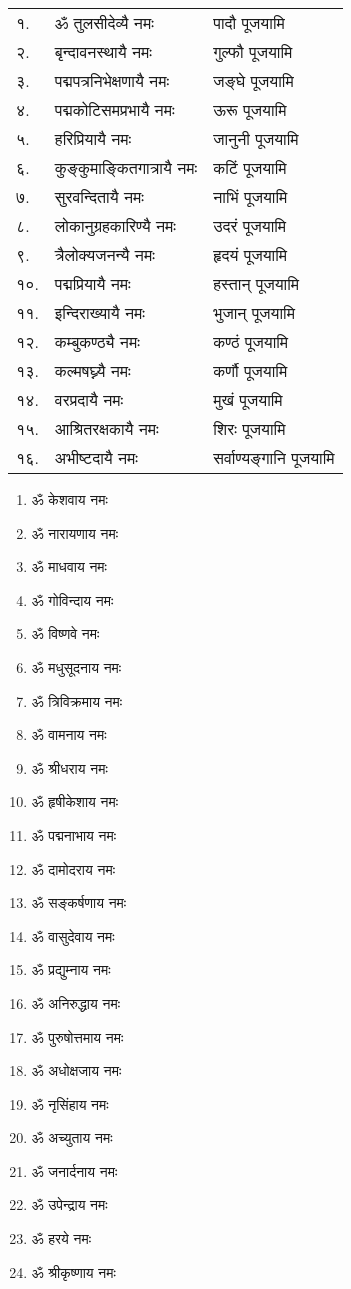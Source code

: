 \begin{longtable}{ll@{— }l}
१.& ॐ तुलसीदेव्यै नमः & पादौ पूजयामि \\
२.& बृन्दावनस्थायै नमः & गुल्फौ पूजयामि\\
३.& पद्मपत्रनिभेक्षणायै नमः & जङ्घे पूजयामि  \\
४.& पद्मकोटिसमप्रभायै नमः & ऊरू पूजयामि\\
५.& हरिप्रियायै नमः & जानुनी पूजयामि   \\
६.& कुङ्कुमाङ्कितगात्रायै नमः & कटिं पूजयामि \\
७.& सुरवन्दितायै नमः & नाभिं पूजयामि        \\
८.& लोकानुग्रहकारिण्यै नमः & उदरं पूजयामि\\
९.& त्रैलोक्यजनन्यै नमः & हृदयं पूजयामि    \\
१०.& पद्मप्रियायै नमः & हस्तान् पूजयामि\\
११.& इन्दिराख्यायै नमः & भुजान् पूजयामि\\
१२.& कम्बुकण्ठ्यै नमः & कण्ठं पूजयामि\\
१३.& कल्मषघ्न्यै नमः & कर्णौ पूजयामि  \\
१४.& वरप्रदायै नमः & मुखं  पूजयामि\\
१५.& आश्रितरक्षकायै नमः & शिरः पूजयामि\\
१६.& अभीष्टदायै नमः & सर्वाण्यङ्गानि पूजयामि   \\
\end{longtable}

\begin{multicols}{2}
\begin{enumerate}
\item ॐ केशवाय नमः
\item ॐ नारायणाय नमः
\item ॐ माधवाय नमः
\item ॐ गोविन्दाय नमः
\item ॐ विष्णवे नमः
\item ॐ मधुसूदनाय नमः
\item ॐ त्रिविक्रमाय नमः
\item ॐ वामनाय नमः
\item ॐ श्रीधराय नमः
\item ॐ हृषीकेशाय नमः
\item ॐ पद्मनाभाय नमः
\item ॐ दामोदराय नमः
\item ॐ सङ्कर्षणाय नमः
\item ॐ वासुदेवाय नमः
\item ॐ प्रद्युम्नाय नमः
\item ॐ अनिरुद्धाय नमः
\item ॐ पुरुषोत्तमाय नमः
\item ॐ अधोक्षजाय नमः
\item ॐ नृसिंहाय नमः
\item ॐ अच्युताय नमः
\item ॐ जनार्दनाय नमः
\item ॐ उपेन्द्राय नमः
\item ॐ हरये नमः
\item ॐ श्रीकृष्णाय नमः
\end{enumerate}
\end{multicols}


